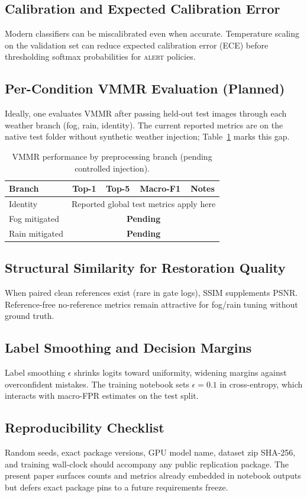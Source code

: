 \subsection{Calibration and Expected Calibration Error}
Modern classifiers can be miscalibrated even when accurate. Temperature scaling on the validation set can reduce expected calibration error (ECE) before thresholding softmax probabilities for \textsc{alert} policies.

\subsection{Per-Condition VMMR Evaluation (Planned)}
Ideally, one evaluates VMMR after passing held-out test images through each weather branch (fog, rain, identity). The current reported metrics are on the native test folder without synthetic weather injection; Table~\ref{tab:vmmrcond} marks this gap.

\begin{table}[!t]
\centering
\caption{VMMR performance by preprocessing branch (pending controlled injection).}
\label{tab:vmmrcond}
\begin{tabular}{@{}lcccc@{}}
\toprule
Branch & Top-1 & Top-5 & Macro-F1 & Notes \\
\midrule
Identity & \multicolumn{4}{l}{Reported global test metrics apply here} \\
Fog mitigated & \multicolumn{4}{c}{\textbf{Pending}} \\
Rain mitigated & \multicolumn{4}{c}{\textbf{Pending}} \\
\bottomrule
\end{tabular}
\end{table}

\subsection{Structural Similarity for Restoration Quality}
When paired clean references exist (rare in gate logs), SSIM supplements PSNR. Reference-free no-reference metrics remain attractive for fog/rain tuning without ground truth.

\subsection{Label Smoothing and Decision Margins}
Label smoothing $\epsilon$ shrinks logits toward uniformity, widening margins against overconfident mistakes. The training notebook sets $\epsilon{=}0.1$ in cross-entropy, which interacts with macro-FPR estimates on the test split.

\subsection{Reproducibility Checklist}
Random seeds, exact package versions, GPU model name, dataset zip SHA-256, and training wall-clock should accompany any public replication package. The present paper surfaces counts and metrics already embedded in notebook outputs but defers exact package pins to a future requirements freeze.
